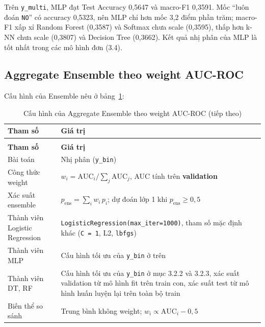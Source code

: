 \documentclass[a4paper]{report}
\begin{document}
Trên \texttt{y\_\allowbreak{}multi}, MLP đạt Test Accuracy 0,5647 và macro-F1 0,3591. Mốc “luôn đoán \texttt{NO}” có accuracy 0,5323, nên MLP chỉ hơn mốc 3,2 điểm phần trăm; macro-F1 xấp xỉ Random Forest (0,3587) và Softmax chưa scale (0,3595), thấp hơn k-NN chưa scale (0,3807) và Decision Tree (0,3662). Kết quả nhị phân của MLP là tốt nhất trong các mô hình đơn (3.4).

\subsection{Aggregate Ensemble theo weight AUC-ROC}

Cấu hình của Ensemble nêu ở bảng~\ref{tb:enscfg}:

{\small{}\renewcommand{}\setlength\tabcolsep{3pt}
\begin{longtable}{|>{\raggedright\arraybackslash}p{151.88pt}|>{\raggedright\arraybackslash}p{289.16pt}|}
\caption{Cấu hình của Aggregate Ensemble theo weight AUC-ROC}\label{tb:enscfg}\\
\hline
\textbf{Tham số} & \textbf{Giá trị} \\ \hline\endfirsthead
\caption[]{Cấu hình của Aggregate Ensemble theo weight AUC-ROC (tiếp theo)}\\
\hline
\textbf{Tham số} & \textbf{Giá trị} \\ \hline\endhead
Bài toán & Nhị phân (\texttt{y\_\allowbreak{}bin}) \\ \hline
Công thức weight & $w_i = \mathrm{AUC}_i / \sum_j \mathrm{AUC}_j$, AUC tính trên \textbf{validation} \\ \hline
Xác suất ensemble & $p_{\text{ens}} = \sum_i w_i\,p_i$; dự đoán lớp 1 khi $p_{\text{ens}} \ge 0{,}5$ \\ \hline
Thành viên Logistic Regression & \texttt{LogisticRegression(max\_\allowbreak{}iter=1000)}, tham số mặc định khác (\texttt{C = 1}, L2, \texttt{lbfgs}) \\ \hline
Thành viên MLP & Cấu hình tối ưu của \texttt{y\_\allowbreak{}bin} ở trên \\ \hline
Thành viên DT, RF & Cấu hình tối ưu của \texttt{y\_\allowbreak{}bin} ở mục 3.2.2 và 3.2.3, xác suất validation từ mô hình fit trên train con, xác suất test từ mô hình huấn luyện lại trên toàn bộ train \\ \hline
Biến thể so sánh & Trung bình không weight; $w_i \propto \mathrm{AUC}_i - 0{,}5$ \\ \hline
\end{longtable}
}
\end{document}
